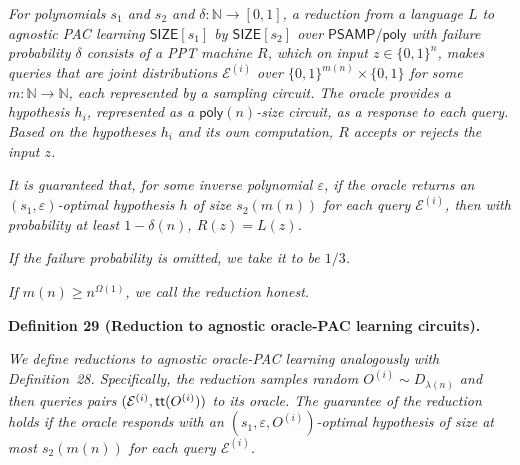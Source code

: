 \emph{For polynomials $s_{1}$ and $s_{2}$ and $\delta:\mathbb{N}\to[0,1]$, a reduction from a language $L$ to agnostic PAC learning ${\mathsf{SIZE}}[s_{1}]$ by ${\mathsf{SIZE}}[s_{2}]$ over ${\mathsf{P}}{\mathsf{SAMP}}/{\mathsf{poly}}$ with failure probability $\delta$ consists of a PPT machine $R$, which on input $z\in\{0,1\}^{n}$, makes queries that are joint distributions $\mathcal{E}^{(i)}$ over $\{0,1\}^{m(n)}\times\{0,1\}$ for some $m:\mathbb{N}\to\mathbb{N}$, each represented by a sampling circuit. The oracle provides a hypothesis $h_{i}$, represented as a ${\mathsf{poly}}(n)$-size circuit, as a response to each query. Based on the hypotheses $h_{i}$ and its own computation, $R$ accepts or rejects the input $z$.}\par




\emph{It is guaranteed that, for some inverse polynomial $\varepsilon$, if the oracle returns an $(s_{1},\varepsilon)$-optimal hypothesis $h$ of size $s_{2}(m(n))$ for each query $\mathcal{E}^{(i)}$, then with probability at least $1-\delta(n)$, $R(z)=L(z)$.}\par




\emph{If the failure probability is omitted, we take it to be $1/3$.}\par




\emph{If $m(n)\geq n^{\Omega(1)}$, we call the reduction honest.}\par







\par\medskip\noindent\textbf{
\textbf{Definition 29}\textbf{ }(Reduction to agnostic oracle-PAC learning circuits)\textbf{.}
}\par



\emph{We define reductions to agnostic oracle-PAC learning analogously with Definition 28. Specifically, the reduction samples random $O^{(i)}\sim D_{\lambda(n)}$ and then queries pairs $(\mathcal{E}^{(i)},{\sf tt}(O^{(i)}))$ to its oracle. The guarantee of the reduction holds if the oracle responds with an $(s_{1},\varepsilon,O^{(i)})$-optimal hypothesis of size at most $s_{2}(m(n))$ for each query $\mathcal{E}^{(i)}$.}\par



